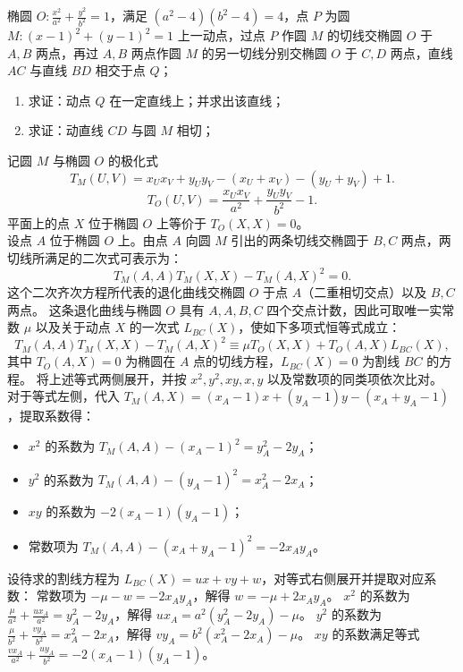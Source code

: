 \begin{example}
椭圆 \(O: \frac{x^2}{a^2} + \frac{y^2}{b^2} = 1\)，满足 \((a^2-4)(b^2-4)=4\)，点 \(P\) 为圆 \(M: (x-1)^2 + (y-1)^2 = 1\) 上一动点，过点 \(P\) 作圆 \(M\) 的切线交椭圆 \(O\) 于 \(A,B\) 两点，再过 \(A,B\) 两点作圆 \(M\) 的另一切线分别交椭圆 \(O\) 于 \(C,D\) 两点，直线 \(AC\) 与直线 \(BD\) 相交于点 \(Q\)；
\begin{enumerate}
    \item[(1)] 求证：动点 \(Q\) 在一定直线上；并求出该直线；
    \item[(2)] 求证：动直线 \(CD\) 与圆 \(M\) 相切；
\end{enumerate}
\end{example}
\begin{solution}
记圆 $M$ 与椭圆 $O$ 的极化式
\[ T_M(U,V) = x_U x_V + y_U y_V - (x_U+x_V) - (y_U+y_V) + 1. \]
\[
T_O(U,V) = \frac{x_U x_V}{a^2} + \frac{y_U y_V}{b^2} - 1.
\]
平面上的点 $X$ 位于椭圆 $O$ 上等价于 $T_O(X,X) = 0$。\\
设点 $A$ 位于椭圆 $O$ 上。由点 $A$ 向圆 $M$ 引出的两条切线交椭圆于 $B, C$ 两点，两切线所满足的二次式可表示为：
\[ T_M(A,A)T_M(X,X) - T_M(A,X)^2 = 0. \]
这个二次齐次方程所代表的退化曲线交椭圆 $O$ 于点 $A$（二重相切交点）以及 $B, C$ 两点。
这条退化曲线与椭圆 $O$ 具有 $A,A,B,C$ 四个交点计数，因此可取唯一实常数 $\mu$ 以及关于动点 $X$ 的一次式 $L_{BC}(X)$，使如下多项式恒等式成立：
\[ T_M(A,A)T_M(X,X) - T_M(A,X)^2 \equiv \mu T_O(X,X) + T_O(A,X) L_{BC}(X), \]
其中 $T_O(A,X)=0$ 为椭圆在 $A$ 点的切线方程，$L_{BC}(X)=0$ 为割线 $BC$ 的方程。
将上述等式两侧展开，并按 $x^2, y^2, xy, x, y$ 以及常数项的同类项依次比对。
对于等式左侧，代入 $T_M(A,X) = (x_A-1)x + (y_A-1)y - (x_A+y_A-1)$，提取系数得：
\begin{itemize}
\item $x^2$ 的系数为 $T_M(A,A) - (x_A-1)^2 = y_A^2 - 2y_A$；
\item $y^2$ 的系数为 $T_M(A,A) - (y_A-1)^2 = x_A^2 - 2x_A$；
\item $xy$ 的系数为 $-2(x_A-1)(y_A-1)$；
\item 常数项为 $T_M(A,A) - (x_A+y_A-1)^2 = -2x_A y_A$。
\end{itemize}
设待求的割线方程为 $L_{BC}(X) = ux + vy + w$，对等式右侧展开并提取对应系数：
常数项为 $-\mu - w = -2x_A y_A$，解得 $w = -\mu + 2x_A y_A$。
$x^2$ 的系数为 $\frac{\mu}{a^2} + \frac{u x_A}{a^2} = y_A^2 - 2y_A$，解得 $u x_A = a^2(y_A^2 - 2y_A) - \mu$。
$y^2$ 的系数为 $\frac{\mu}{b^2} + \frac{v y_A}{b^2} = x_A^2 - 2x_A$，解得 $v y_A = b^2(x_A^2 - 2x_A) - \mu$。
$xy$ 的系数满足等式 $\frac{v x_A}{a^2} + \frac{u y_A}{b^2} = -2(x_A-1)(y_A-1)$。

\end{solution}
